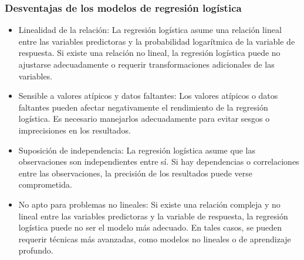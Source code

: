\subsubsection{Desventajas de los modelos de regresión logística}

\begin{itemize}
    \item Linealidad de la relación: La regresión logística asume una relación lineal entre las variables predictoras y la probabilidad logarítmica de la variable de respuesta. Si existe una relación no lineal, la regresión logística puede no ajustarse adecuadamente o requerir transformaciones adicionales de las variables.
    \item Sensible a valores atípicos y datos faltantes: Los valores atípicos o datos faltantes pueden afectar negativamente el rendimiento de la regresión logística. Es necesario manejarlos adecuadamente para evitar sesgos o imprecisiones en los resultados.
    \item Suposición de independencia: La regresión logística asume que las observaciones son independientes entre sí. Si hay dependencias o correlaciones entre las observaciones, la precisión de los resultados puede verse comprometida.
    \item No apto para problemas no lineales: Si existe una relación compleja y no lineal entre las variables predictoras y la variable de respuesta, la regresión logística puede no ser el modelo más adecuado. En tales casos, se pueden requerir técnicas más avanzadas, como modelos no lineales o de aprendizaje profundo.
\end{itemize}